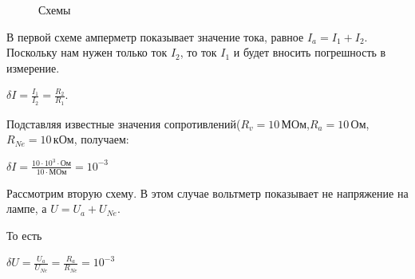 \begin{figure}[H]
\begin{minipage}[H]{0.49\linewidth}
\end{minipage}
\caption{Схемы}
\end{figure}


В первой схеме амперметр показывает значение тока, равное $I_a=I_1+I_2$. Поскольку нам нужен только ток $I_2$, то ток $I_1$ и будет вносить погрешность в измерение. 
\begin{center}
$\delta I= \frac{I_1}{I_2}=\frac{R_2}{R_1}$. 
\end{center}
Подставляя известные значения сопротивлений($R_v=10\, \text{МОм}$,$R_a=10\, \text{Ом}$,$R_{Ne}=10 \,\text{кОм}$, получаем:
\begin{center}
$\delta I=\frac{10\cdot10^3\cdot\text{Ом}}{10\cdot \text{МОм}}=10^{-3}$
\end{center}
Рассмотрим вторую схему. В этом случае вольтметр  показывает не напряжение на лампе, а $U=U_a+U_{Ne}$.

То есть 

\begin{center}
$ \delta U =\frac{U_a}{U_{Ne}}=\frac{R_a}{R_{Ne}} = 10^{-3} $
\end{center}



